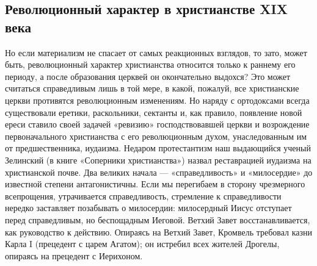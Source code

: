 \subsection{Революционный характер в христианстве XIX века}

Но  если материализм  не  спасает от  самых  реакционных взглядов,  то
зато,  может  быть,   революционный  характер  христианства  относится
только  к  раннему  его  периоду,   а  после  образования  церквей  он
окончательно  выдохся?   Это  может  считаться  справедливым   лишь  в
той  мере,  в  какой,  пожалуй,  все  христианские  церкви  противятся
революционным изменениям. Но наряду  с ортодоксами всегда существовали
еретики,  раскольники,  сектанты  и,   как  правило,  появление  новой
ереси  ставило  своей  задачей  «ревизию»  господствовавшей  церкви  и
возрождение  первоначального христианства  с его  революционным духом,
унаследованным им от  предшественника, иудаизма. Недаром протестантизм
наш  выдающийся ученый  Зелинский (в  книге «Соперники  христианства»)
назвал  реставрацией  иудаизма  на  христианской  почве.  Два  великих
начала  ---  «справедливость»  и  «милосердие»  до  известной  степени
антагонистичны. Если мы перегибаем  в сторону чрезмерного всепрощения,
утрачивается  справедливость,  стремление   к  справедливости  нередко
заставляет позабывать о милосердии:  милосердный Иисус отступает перед
справедливым, но беспощадным  Иеговой. Ветхий Завет восстанавливается,
как  руководство  к  действию.  Опираясь  на  Ветхий  Завет,  Кромвель
требовал казни  Карла I (прецедент  с царем Агатом); он  истребил всех
жителей Дрогелы, опираясь на прецедент с Иерихоном.

